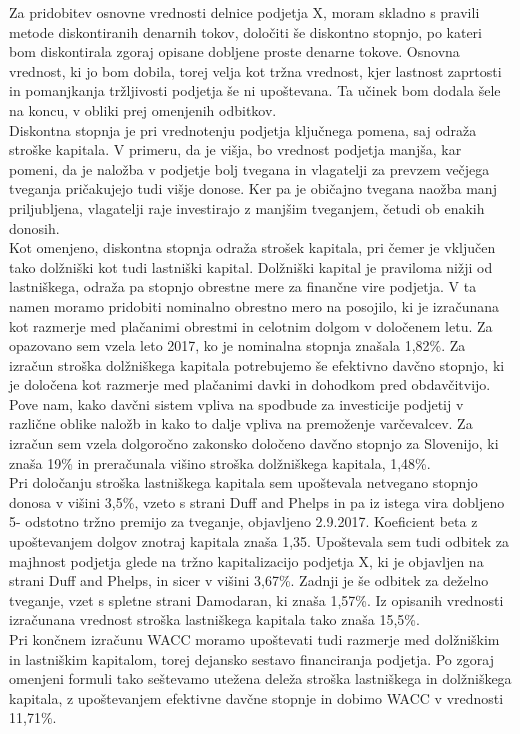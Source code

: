 \documentclass[12pt,a4paper]{amsart}
\theoremstyle{definition} %
\theoremstyle{plain} %
\begin{document}
Za pridobitev osnovne vrednosti delnice podjetja X, moram skladno s pravili metode diskontiranih denarnih tokov, določiti še diskontno stopnjo, po kateri bom diskontirala zgoraj opisane dobljene proste denarne tokove. Osnovna vrednost, ki jo bom dobila, torej velja kot tržna vrednost, kjer lastnost zaprtosti in pomanjkanja tržljivosti podjetja še ni upoštevana. Ta učinek bom dodala šele na koncu, v obliki prej omenjenih odbitkov. \\
Diskontna stopnja je pri vrednotenju podjetja ključnega pomena, saj odraža stroške kapitala. V primeru, da je višja, bo vrednost podjetja manjša, kar pomeni, da je naložba v podjetje bolj tvegana in vlagatelji za prevzem večjega tveganja pričakujejo tudi višje donose. Ker pa je običajno tvegana naožba manj priljubljena, vlagatelji raje investirajo z manjšim tveganjem, četudi ob enakih donosih.\\
Kot omenjeno, diskontna stopnja odraža strošek kapitala, pri čemer je vključen tako dolžniški kot tudi lastniški kapital. Dolžniški kapital je praviloma nižji od lastniškega, odraža pa stopnjo obrestne mere za finančne vire podjetja. V ta namen moramo pridobiti nominalno obrestno mero na posojilo, ki je izračunana kot razmerje med plačanimi obrestmi in celotnim dolgom v določenem letu. Za opazovano sem vzela leto 
2017, ko je nominalna stopnja znašala 1,82\%.  Za izračun stroška dolžniškega kapitala potrebujemo še efektivno davčno stopnjo, ki je določena kot razmerje med plačanimi davki in dohodkom pred obdavčitvijo. Pove nam, kako davčni sistem vpliva na spodbude za investicije podjetij v različne oblike naložb in kako to dalje vpliva na premoženje varčevalcev. Za izračun sem vzela dolgoročno zakonsko določeno davčno stopnjo za Slovenijo, ki znaša 19\% in preračunala višino stroška dolžniškega kapitala, 1,48\%.\\
Pri določanju stroška lastniškega kapitala sem upoštevala netvegano stopnjo donosa v višini 3,5\%, vzeto s strani Duff and Phelps in pa iz istega vira dobljeno 5- odstotno tržno premijo za tveganje, objavljeno 2.9.2017. Koeficient beta z upoštevanjem dolgov znotraj kapitala znaša 1,35. Upoštevala sem tudi odbitek za majhnost podjetja glede na tržno kapitalizacijo podjetja X, ki je objavljen na strani Duff and Phelps, in sicer v višini 3,67\%. Zadnji je še odbitek za deželno tveganje, vzet s spletne strani Damodaran, ki znaša 1,57\%. Iz opisanih vrednosti izračunana vrednost stroška lastniškega kapitala tako znaša 15,5\%.\\
Pri končnem izračunu WACC moramo upoštevati tudi razmerje med dolžniškim in lastniškim kapitalom, torej dejansko sestavo financiranja podjetja. Po zgoraj omenjeni formuli tako seštevamo utežena deleža stroška lastniškega in dolžniškega kapitala, z upoštevanjem efektivne davčne stopnje in dobimo WACC v vrednosti 11,71\%.\\
  
\end{document}
